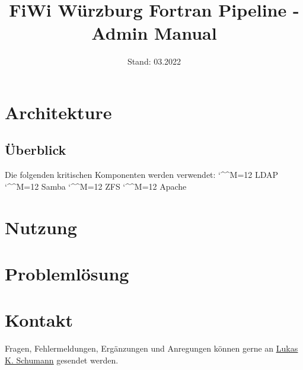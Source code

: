 \documentclass[11pt, a4paper]{article}
\title{\vspace{-3cm}FiWi Würzburg Fortran Pipeline - Admin Manual}
\date{Stand: 03.2022}
\def\e{\begingroup\catcode`\^^M=12 \xmymacro}
{\catcode`\^^M=12 %
 \gdef\xmymacro#1^^M{\begin{itemize}\item #1\end{itemize}\endgroup}%
}
\begin{document}
\maketitle

\bigskip\noindent


\vspace{-1cm}
\section{Architekture}

\subsection{Überblick}
Die folgenden kritischen Komponenten werden verwendet:
\e LDAP
\e Samba
\e ZFS
\e Apache

\section{Nutzung}

\section{Problemlösung}

\section{Kontakt}

Fragen, Fehlermeldungen, Ergänzungen und Anregungen können gerne an \underline{\href{mailto:lukas_kilian.schumann@stud-mail.uni-wuerzburg.de}{Lukas K. Schumann}} gesendet werden.
\end{document}
